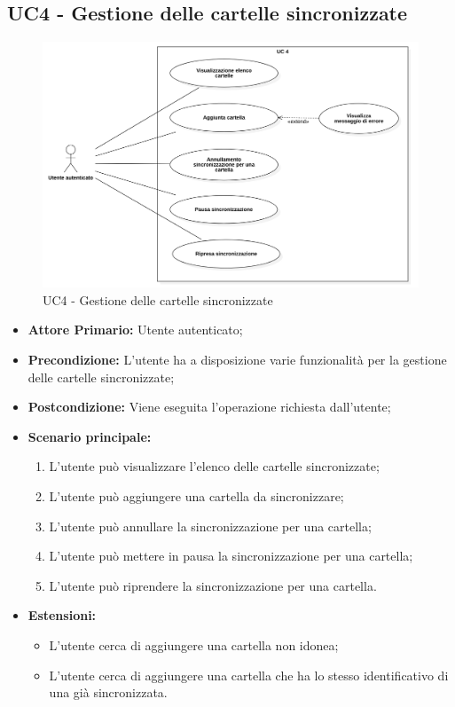 \subsection{UC4 - Gestione delle cartelle sincronizzate}
\begin{figure}[H]
    \centering
    \includegraphics[scale = 0.5]{components/img/UC4.png}
    \caption{UC4 - Gestione delle cartelle sincronizzate}
\end{figure}
\begin{itemize}
\item \textbf{Attore Primario:} Utente autenticato;
\item \textbf{Precondizione:} L'utente ha a disposizione varie funzionalità per la gestione delle cartelle sincronizzate;
\item \textbf{Postcondizione:} Viene eseguita l'operazione richiesta dall'utente;
\item \textbf{Scenario principale:}
    \begin{enumerate}
    \item L'utente può visualizzare l'elenco delle cartelle sincronizzate;
    \item L'utente può aggiungere una cartella da sincronizzare;
    \item L'utente può annullare la sincronizzazione per una cartella;
    \item L'utente può mettere in pausa la sincronizzazione per una cartella;
    \item L'utente può riprendere la sincronizzazione per una cartella.
    \end{enumerate}
\item \textbf{Estensioni:}
\begin{itemize}
\item L'utente cerca di aggiungere una cartella non idonea;
\item L'utente cerca di aggiungere una cartella che ha lo stesso identificativo di una già sincronizzata.
\end{itemize}
\end{itemize}